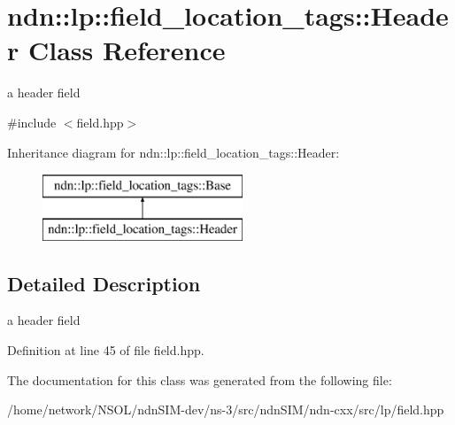 \hypertarget{classndn_1_1lp_1_1field__location__tags_1_1Header}{}\section{ndn\+:\+:lp\+:\+:field\+\_\+location\+\_\+tags\+:\+:Header Class Reference}
\label{classndn_1_1lp_1_1field__location__tags_1_1Header}


a header field  




{\ttfamily \#include $<$field.\+hpp$>$}

Inheritance diagram for ndn\+:\+:lp\+:\+:field\+\_\+location\+\_\+tags\+:\+:Header\+:\begin{figure}[H]
\begin{center}
\leavevmode
\includegraphics[height=2.000000cm]{classndn_1_1lp_1_1field__location__tags_1_1Header}
\end{center}
\end{figure}


\subsection{Detailed Description}
a header field 

Definition at line 45 of file field.\+hpp.



The documentation for this class was generated from the following file\+:\begin{DoxyCompactItemize}
\item 
/home/network/\+N\+S\+O\+L/ndn\+S\+I\+M-\/dev/ns-\/3/src/ndn\+S\+I\+M/ndn-\/cxx/src/lp/field.\+hpp\end{DoxyCompactItemize}
